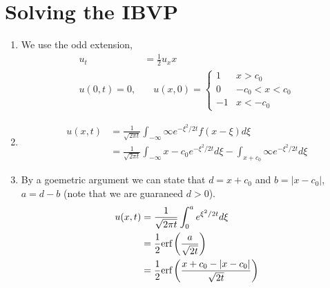 \documentclass{article}
\begin{document}
\section{Solving the IBVP}
    \begin{enumerate}[label=\roman*)]
        \item We use the odd extension, 
        \begin{align*}
            u_t &= \frac{1}{2}u_xx
            \\
            u(0,t) = 0, &\quad u(x,0) = \begin{cases}1 & x > c_0\\0 &
            -c_0<x<c_0\\ -1 & x < -c_0\end{cases}
        \end{align*}
        \item 
        \begin{align*}
            u(x,t) &= \frac{1}{\sqrt{2\pi t}} \int_{-\infty}{\infty}
            e^{-\xi^2/2t} f(x-\xi)d\xi\\
            &= \frac{1}{\sqrt{2\pi t}} \int_{-\infty}{x-c_0}
            e^{-\xi^2/2t}d\xi - \int_{x + c_0}{\infty}
            e^{-\xi^2/2t}d\xi
        \end{align*}
        \item 
            By a goemetric argument we can state that $d = x+c_0$ and $b =
            |x-c_0|$, $a = d-b$ (note that we are guaraneed $d > 0$). 
            \begin{align*}
                u(x,t) &= \frac{1}{\sqrt{2\pi t}} \int_0^a e^{\xi^2/2t}d\xi 
                \\
                &= \frac{1}{2}\text{erf}\left(\frac{a}{\sqrt{2t}}\right)
                \\
                &= \frac{1}{2}\text{erf}\left(\frac{x+c_0 - |x-c_0|}{\sqrt{2t}}\right)
            \end{align*}
    \end{enumerate}
\end{document}
